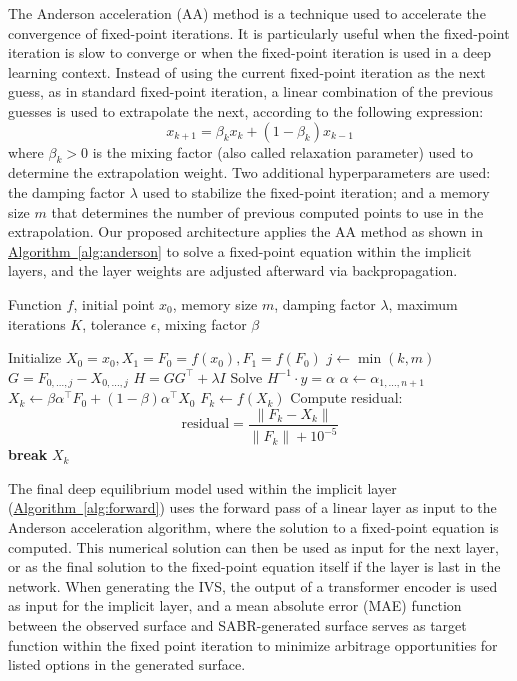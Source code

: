The Anderson acceleration (AA) method is a technique used to accelerate the convergence of fixed-point iterations.
It is particularly useful when the fixed-point iteration is slow to converge or when the fixed-point iteration is used in a deep learning context.
Instead of using the current fixed-point iteration as the next guess, as in standard fixed-point iteration,
a linear combination of the previous guesses is used to extrapolate the next, according to the following expression:
\[
    x_{k+1} = \beta_{k} x_{k} + (1 - \beta_{k}) x_{k-1}
\]
where $\beta_{k} > 0$ is the mixing factor (also called relaxation parameter) used to determine the extrapolation weight.
Two additional hyperparameters are used: the damping factor $\lambda$ used to stabilize the fixed-point iteration;
and a memory size $m$ that determines the number of previous computed points to use in the extrapolation.
Our proposed architecture applies the AA method as shown in \hyperref[alg:anderson]{Algorithm~\ref*{alg:anderson}}
to solve a fixed-point equation within the implicit layers, and the layer weights are adjusted afterward via backpropagation.

\begin{algorithm}
    \begin{algorithmic}[1]
        \Require Function \( f \), initial point \( x_0 \), memory size \( m \), damping factor \( \lambda \), maximum iterations \( K \), tolerance \( \epsilon \), mixing factor \( \beta \)

        \State Initialize \( X_0 = x_0, X_1 = F_0 = f(x_0), F_1 = f(F_0) \)
            \State \( j \gets \min(k, m) \)
            \State \( G = F_{0, \ldots, j} - X_{ 0, \ldots, j} \)
            \State \( H = G G^\top + \lambda I \)
            \State Solve \( H^{-1} \cdot y = \alpha \)
            \State \( \alpha \gets \alpha_{1, \ldots, n + 1} \)
            \State \( X_k \gets \beta \alpha^\top F_0 + (1 - \beta) \alpha^\top X_0 \)
            \State \( F_k \gets f(X_k) \)
            \State Compute residual:
            \[
                \text{residual} = \frac{\| F_k - X_k \|}{\| F_k \| + 10^{-5}}
            \]
                \State \textbf{break}
            \EndIf
        \EndFor
        \State \Return \( X_k \)
    \end{algorithmic}
    \caption{Equilibrium Model with Anderson Acceleration}
    \label{alg:anderson}
\end{algorithm}

The final deep equilibrium model used within the implicit layer (\hyperref[alg:forward]{Algorithm~\ref*{alg:forward}})
uses the forward pass of a linear layer as input to the Anderson acceleration algorithm, where the solution to a fixed-point equation is computed.
This numerical solution can then be used as input for the next layer, or as the final solution to the fixed-point equation itself if the layer is last in the network.
When generating the IVS, the output of a transformer encoder is used as input for the implicit layer,
and a mean absolute error (MAE) function between the observed surface and SABR-generated surface serves as target function
within the fixed point iteration to minimize arbitrage opportunities for listed options in the generated surface.

